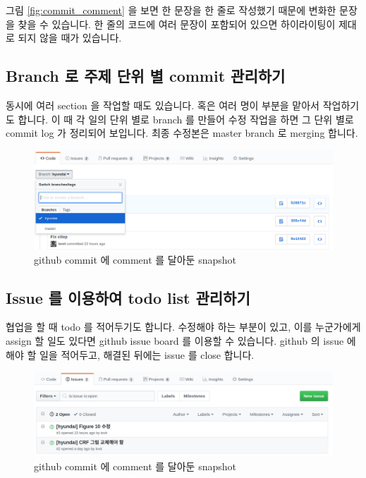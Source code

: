 \documentclass[11pt]{article}
\begin{document}
그림 \ref{fig:commit_comment} 을 보면 한 문장을 한 줄로 작성했기 때문에 변화한 문장을 찾을 수 있습니다.
한 줄의 코드에 여러 문장이 포함되어 있으면 하이라이팅이 제대로 되지 않을 때가 있습니다.

\subsection{Branch 로 주제 단위 별 commit 관리하기}

동시에 여러 section 을 작업할 때도 있습니다.
혹은 여러 명이 부분을 맡아서 작업하기도 합니다.
이 때 각 일의 단위 별로 branch 를 만들어 수정 작업을 하면 그 단위 별로 commit log 가 정리되어 보입니다.
최종 수정본은 master branch 로 merging 합니다.

\begin{figure}[H]
\centering
\includegraphics[keepaspectratio=true, width=0.8\linewidth]{figures/github-branch.png}
\caption{github commit 에 comment 를 달아둔 snapshot}
\label{fig:github-branch}
\end{figure}

\subsection{Issue 를 이용하여 todo list 관리하기}

협업을 할 때 todo 를 적어두기도 합니다.
수정해야 하는 부분이 있고, 이를 누군가에게 assign 할 일도 있다면 github issue board 를 이용할 수 있습니다.
github 의 issue 에 해야 할 일을 적어두고, 해결된 뒤에는 issue 를 close 합니다.

\begin{figure}[H]
\centering
\includegraphics[keepaspectratio=true, width=0.8\linewidth]{figures/github-issue.png}
\caption{github commit 에 comment 를 달아둔 snapshot}
\label{fig:github-issue}
\end{figure}
\end{document}
